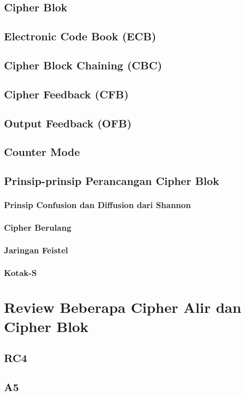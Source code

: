 \documentclass{book}
\begin{document}
    \section{Cipher Blok}
    \section{Electronic Code Book (ECB)}
    \section{Cipher Block Chaining (CBC)}
    \section{Cipher Feedback (CFB)}
    \section{Output Feedback (OFB)}
    \section{Counter Mode}
    \section{Prinsip-prinsip Perancangan Cipher Blok}
        \subsection{Prinsip Confusion dan Diffusion dari Shannon}
        \subsection{Cipher Berulang}
        \subsection{Jaringan Feistel}
        \subsection{Kotak-S}
\chapter{Review Beberapa Cipher Alir dan Cipher Blok}
     \section{RC4}
     \section{A5}
\end{document}
